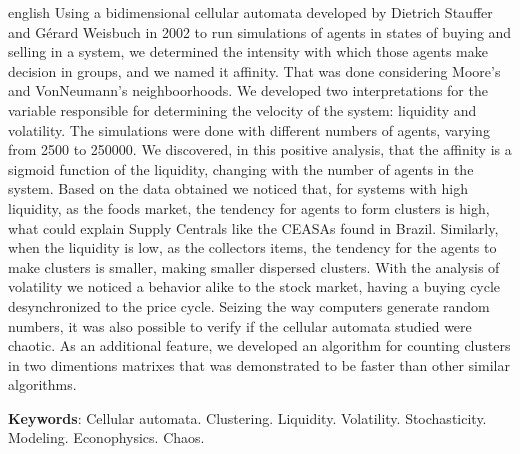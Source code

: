 \documentclass[
	12pt,				%
	openright,			%
	twoside,			%
	a4paper,			%
	english,			%
	french,				%
	spanish,			%
	brazil				%
	]{abntex2}
\newcommand{\listofquadrosname}{Lista de quadros}
\begin{document}
\begin{resumo}[Abstract]
 \begin{otherlanguage*}{english}
   Using a bidimensional cellular automata developed by Dietrich Stauffer and Gérard Weisbuch in 2002 to run simulations of agents in states of buying and selling in a system, we determined the intensity with which those agents make decision in groups, and we named it affinity. That was done considering Moore's and VonNeumann's neighboorhoods. We developed two interpretations for the variable responsible for determining the velocity of the system: liquidity and volatility. The simulations were done with different numbers of agents, varying from 2500 to 250000. We discovered, in this positive analysis, that the affinity is a sigmoid function of the liquidity, changing with the number of agents in the system. Based on the data obtained we noticed that, for systems with high liquidity, as the foods market, the tendency for agents to form clusters is high, what could explain Supply Centrals like the CEASAs found in Brazil. Similarly, when the liquidity is low, as the collectors items, the tendency for the agents to make clusters is smaller, making smaller dispersed clusters. With the analysis of volatility we noticed a behavior alike to the stock market, having a buying cycle desynchronized to the price cycle. Seizing the way computers generate random numbers, it was also possible to verify if the cellular automata studied were chaotic. As an additional feature, we developed an algorithm for counting clusters in two dimentions matrixes that was demonstrated to be faster than other similar algorithms.

   \vspace{\onelineskip}
 
   \noindent 
   \textbf{Keywords}: Cellular automata. Clustering. Liquidity. Volatility. Stochasticity. Modeling. Econophysics. Chaos.
 \end{otherlanguage*}
\end{resumo}

\listoffigures*
\cleardoublepage


\listoftables*
\cleardoublepage
\end{document}
